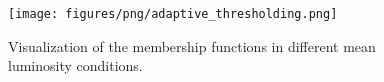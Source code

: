\begin{figure}[h]
    \centering
    \texttt{[image: figures/png/adaptive\_thresholding.png]}
    \caption{Visualization of the membership functions in different mean luminosity conditions.}
    \label{fig:adaptive_thresholding}
\end{figure}